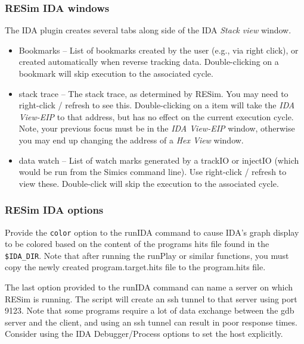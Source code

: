 \documentclass[titlepage]{article}
\begin{document}
\subsubsection{RESim IDA windows}
The IDA plugin creates several tabs along side of the IDA \textit{Stack view} window.  
\begin{itemize}
\item Bookmarks -- List of bookmarks created by the user (e.g., via right click), or created automatically when reverse tracking data.
Double-clicking on a bookmark will skip execution to the associated cycle.
\item stack trace -- The stack trace, as determined by RESim.  You may need to right-click / refresh to see this.  Double-clicking on a item
will take the \textit{IDA View-EIP} to that address, but has no effect on the current execution cycle.  Note, your previous focus must be in
the \textit{IDA View-EIP} window, otherwise you may end up changing the address of a \textit{Hex View} window.
\item data watch -- List of watch marks generated by a trackIO or injectIO (which would be run from the Simics command line).  
Use right-click / refresh to view these.  Double-click will skip the execution to the associated cycle.
\end{itemize}

\subsubsection{RESim IDA options}
Provide the {\tt color} option to the runIDA command to cause IDA's graph display to be colored based on the content of the
programs hits file found in the {\tt \$IDA\_DIR}.  Note that after running the runPlay or similar functions, you must copy the
newly created program.target.hits file to the program.hits file.

The last option provided to the runIDA command can name a server on which RESim is running. The script will create an ssh tunnel to that
server using port 9123.  Note that some programs require a lot of data exchange between the gdb server and the client, and using an ssh 
tunnel can result in poor response times.  Consider using the IDA Debugger/Process options to set the host explicitly.
\end{document}
